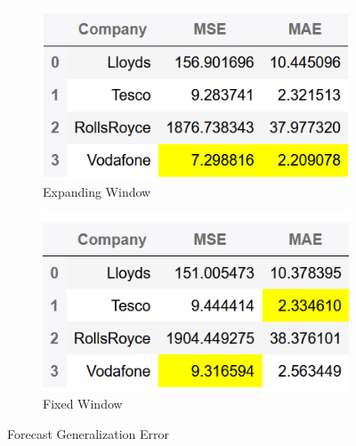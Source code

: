 \begin{figure}[H]
\begin{subfigure}{.49\linewidth}
  \includegraphics[width=\linewidth]{images/garchForecasts/expandingWindow.png}
  \caption{Expanding Window}
  \label{fig:A}
\end{subfigure} %
\begin{subfigure}{.49\linewidth}
  \includegraphics[width=\linewidth]{images/garchForecasts/fixedWindow.png}
  \caption{Fixed Window}
  \label{fig:B}
\end{subfigure}
\caption{Forecast Generalization Error}
\end{figure}

